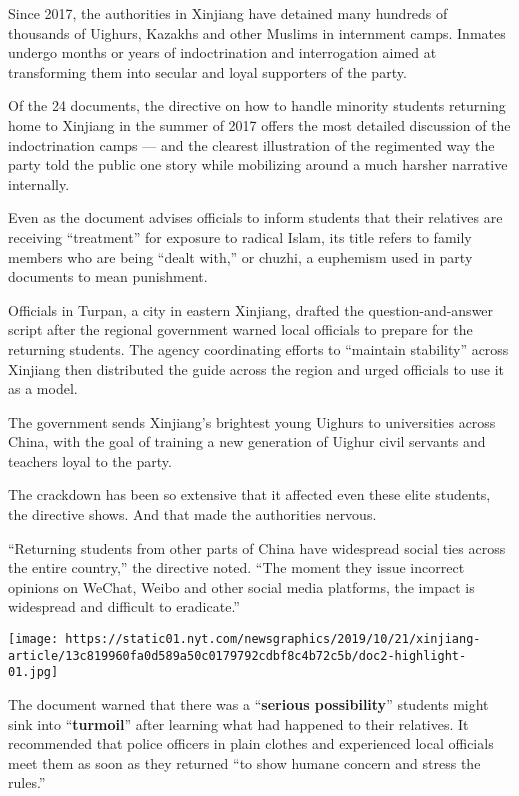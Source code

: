 Since 2017, the authorities in Xinjiang have detained many hundreds of
thousands of Uighurs, Kazakhs and other Muslims in internment camps.
Inmates undergo months or years of indoctrination and interrogation
aimed at transforming them into secular and loyal supporters of the
party.

Of the 24 documents, the directive on how to handle minority students
returning home to Xinjiang in the summer of 2017 offers the most
detailed discussion of the indoctrination camps --- and the clearest
illustration of the regimented way the party told the public one story
while mobilizing around a much harsher narrative internally.

Even as the document advises officials to inform students that their
relatives are receiving ``treatment'' for exposure to radical Islam, its
title refers to family members who are being ``dealt with,'' or chuzhi,
a euphemism used in party documents to mean punishment.

Officials in Turpan, a city in eastern Xinjiang, drafted the
question-and-answer script after the regional government warned local
officials to prepare for the returning students. The agency coordinating
efforts to ``maintain stability'' across Xinjiang then distributed the
guide across the region and urged officials to use it as a model.

The government sends Xinjiang's brightest young Uighurs to universities
across China, with the goal of training a new generation of Uighur civil
servants and teachers loyal to the party.

The crackdown has been so extensive that it affected even these elite
students, the directive shows. And that made the authorities nervous.

``Returning students from other parts of China have widespread social
ties across the entire country,'' the directive noted. ``The moment they
issue incorrect opinions on WeChat, Weibo and other social media
platforms, the impact is widespread and difficult to eradicate.''

\texttt{[image: https://static01.nyt.com/newsgraphics/2019/10/21/xinjiang-article/13c819960fa0d589a50c0179792cdbf8c4b72c5b/doc2-highlight-01.jpg]}

The document warned that there was a ``\textbf{serious possibility}''
students might sink into ``\textbf{turmoil}'' after learning what had
happened to their relatives. It recommended that police officers in
plain clothes and experienced local officials meet them as soon as they
returned ``to show humane concern and stress the rules.''

